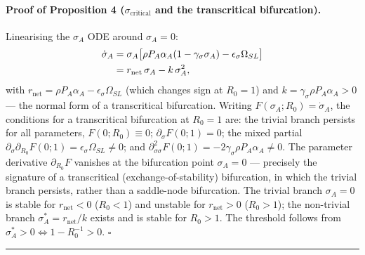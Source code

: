 \documentclass{article}
\theoremstyle{definition}
\begin{document}
\paragraph*{Proof of Proposition 4 ($\sigma_{\text{critical}}$ and the
transcritical bifurcation).}
Linearising the $\sigma_A$ ODE around $\sigma_A = 0$:
\begin{align}
\dot{\sigma}_A &= \sigma_A\bigl[\rho P_A\alpha_A(1-\gamma_\sigma\sigma_A) - \epsilon_\sigma\Omega_{SL}\bigr] \notag\\
&= r_{\text{net}}\,\sigma_A - k\,\sigma_A^2,
\label{eq:bif-normal-form}
\end{align}
with $r_{\text{net}} = \rho P_A \alpha_A - \epsilon_\sigma \Omega_{SL}$
(which changes sign at $R_0 = 1$) and $k = \gamma_\sigma \rho P_A
\alpha_A > 0$ --- the normal form of a transcritical bifurcation.
Writing $F(\sigma_A; R_0) = \dot{\sigma}_A$, the conditions for a
transcritical bifurcation at $R_0 = 1$ are: the trivial branch persists
for all parameters, $F(0; R_0) \equiv 0$; $\partial_\sigma F(0; 1) = 0$;
the mixed partial $\partial_\sigma \partial_{R_0} F(0; 1) =
\epsilon_\sigma \Omega_{SL} \neq 0$; and
$\partial^2_{\sigma\sigma} F(0; 1) = -2\gamma_\sigma \rho P_A \alpha_A
\neq 0$. The parameter derivative $\partial_{R_0} F$ vanishes at the
bifurcation point $\sigma_A = 0$ --- precisely the signature of a
transcritical (exchange-of-stability) bifurcation, in which the trivial
branch persists, rather than a saddle-node bifurcation. The trivial
branch $\sigma_A = 0$ is stable for $r_{\text{net}} < 0$ ($R_0 < 1$) and
unstable for $r_{\text{net}} > 0$ ($R_0 > 1$); the non-trivial branch
$\sigma_A^* = r_{\text{net}}/k$ exists and is stable for $R_0 > 1$. The
threshold follows from $\sigma_A^* > 0 \iff 1 - R_0^{-1} > 0$. $\square$

\noindent\rule{\linewidth}{0.4pt}

\clearpage



\end{document}
